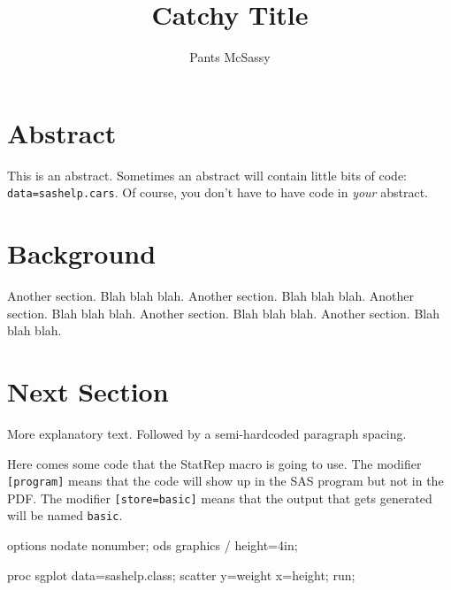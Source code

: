 \documentclass[10pt,oneside]{article}
\title{Catchy Title}
\author{Pants McSassy}
\newcommand\DocPaperNumber{Paper XX-nn}
\begin{document}
%
\begin{center}%
\makeatletter%
\fontsize{10}{18}\selectfont{\bf\DocPaperNumber\\}\medskip
\fontsize{14}{18}\selectfont{\bf\@title        \\}\medskip
\fontsize{12}{14}\selectfont{   \@author         }\medskip
\makeatother
\end{center}

\section*{Abstract}

This is an abstract. Sometimes an abstract will contain little bits of code: \texttt{data=sashelp.cars}. Of course, you don't have to have code in \textit{your} abstract. 

\section{Background}

Another section. Blah blah blah.
Another section. Blah blah blah.
Another section. Blah blah blah.
Another section. Blah blah blah.
Another section. Blah blah blah.

\section{Next Section}

More explanatory text. Followed by a semi-hardcoded paragraph spacing.

\vspace{3mm}
Here comes some code that the StatRep macro is going to use. The modifier \texttt{[program]} means that the code will show up in the SAS program but not in the PDF. The modifier \texttt{[store=basic]} means that the output that gets generated will be named \texttt{basic}.

\begin{Sascode}[program]
options nodate nonumber;
ods graphics / height=4in;
\end{Sascode}

\begin{Sascode}[store=basics]
proc sgplot data=sashelp.class;
   scatter y=weight x=height;
run;
\end{Sascode}
\end{document}
